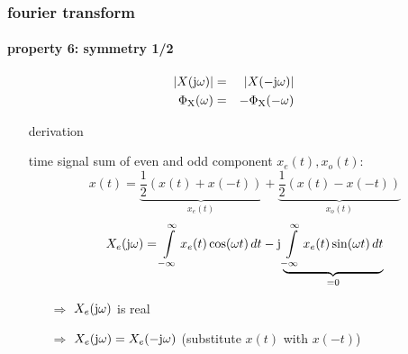	\begin{frame}\frametitle[allowframebreaks]{fourier transform}\framesubtitle{property 6: symmetry 1/2}
		\begin{eqnarray}
			|X(\mathrm{j}\omega)| &=& |X(-\mathrm{j}\omega)|\\
			\Phi_\mathrm{X}(\omega) &=& -\Phi_\mathrm{X}(-\omega) 
		\end{eqnarray}
		\pause
		\vspace{-5mm}
		\begin{itemize}
			\item[]	derivation
			
			\begin{footnotesize}
				time signal sum of even and odd component $x_e(t), x_o(t)$:
				\begin{equation}
					x(t) = \underbrace{\frac{1}{2}(x(t) + x(-t))}_{x_e(t)} + \underbrace{\frac{1}{2}(x(t) - x(-t))}_{x_o(t)} 
				\end{equation}
				\pause
				\begin{equation}
					X_e(\mathrm{j}\omega) = \int\limits_{-\infty}^{\infty}{x_e(t)\cos(\omega t)\,dt} - \mathrm{j} \underbrace{\int\limits_{-\infty}^{\infty}{x_e(t)\sin(\omega t)\,dt}}_{= 0}\nonumber
				\end{equation}
				\pause
		\vspace{-5mm}
				\begin{itemize}
					\item[$\Rightarrow$]	$X_e(\mathrm{j}\omega)$ is real
					\item[$\Rightarrow$]	$X_e(\mathrm{j}\omega) = X_e(-\mathrm{j}\omega)$ (substitute $x(t)$ with $x(-t)$)
				\end{itemize}
			\end{footnotesize}
		\end{itemize}
	\end{frame}	

